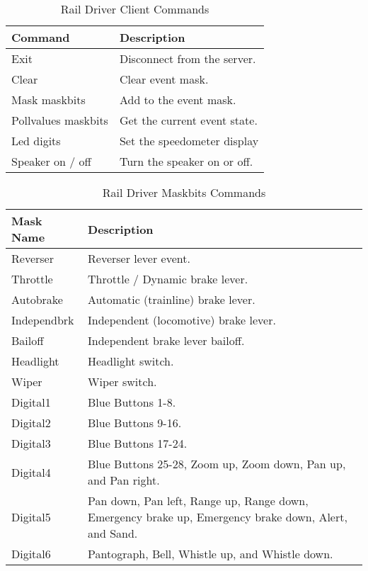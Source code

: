 \begin{table}[hbpt]
\begin{centering}
\begin{tabular}{|l|p{3in}|}
\hline
\textbf{Command} & \textbf{Description} \\
\hline
\hline
Exit & Disconnect from the server. \\
\hline
Clear & Clear event mask. \\
\hline
Mask maskbits & Add to the event mask. \\
\hline
Pollvalues maskbits & Get the current event state. \\
\hline
Led digits & Set the speedometer display \\
\hline
Speaker on / off & Turn the speaker on or off. \\
\hline
\end{tabular}
\caption{Rail Driver Client Commands}
\label{tab:rd:rdclient}
\end{centering}
\end{table}
\begin{table}[hbpt]
\begin{centering}
\begin{tabular}{|l|p{3in}|}
\hline
\textbf{Mask Name} & \textbf{Description} \\
\hline
\hline
Reverser& Reverser lever event.\\
\hline     
Throttle& Throttle / Dynamic brake lever.\\
\hline
Autobrake& Automatic (trainline) brake lever.\\
\hline     
Independbrk& Independent (locomotive) brake lever.\\
\hline     
Bailoff& Independent brake lever bailoff.\\
\hline     
Headlight& Headlight switch.\\
\hline     
Wiper& Wiper switch.\\
\hline     
Digital1& Blue Buttons 1-8.\\
\hline     
Digital2&  Blue Buttons 9-16.\\
\hline     
Digital3& Blue Buttons 17-24. \\
\hline     
Digital4& Blue Buttons 25-28, Zoom up, Zoom down, Pan up, and Pan right.\\
\hline     
Digital5& Pan down, Pan left, Range up, Range down, Emergency brake up,
Emergency brake down, Alert, and Sand. \\
\hline     
Digital6& Pantograph, Bell, Whistle up, and Whistle down. \\
\hline     
 \end{tabular}
\caption{Rail Driver Maskbits Commands}
\label{tab:rd:maskbits}
\end{centering}
\end{table}
